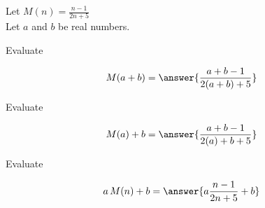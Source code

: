 \documentclass{ximera}
\author{Lee Wayand}
\begin{document}
\begin{exercise}





Let $M(n) = \frac{n-1}{2n+5}$ \\

Let $a$ and $b$ be real numbers. \\





\begin{question}


Evaluate  

\[
M(a+b) = \answer{\frac{a+b-1}{2(a+b)+5}}
\]


\end{question}








\begin{question}


Evaluate  

\[
M(a)+b = \answer{\frac{a+b-1}{2(a)+b+5}}
\]


\end{question}









\begin{question}


Evaluate  

\[
a \, M(n)+b = \answer{a \frac{n-1}{2n+5} + b}
\]


\end{question}




















\end{exercise}
\end{document}
